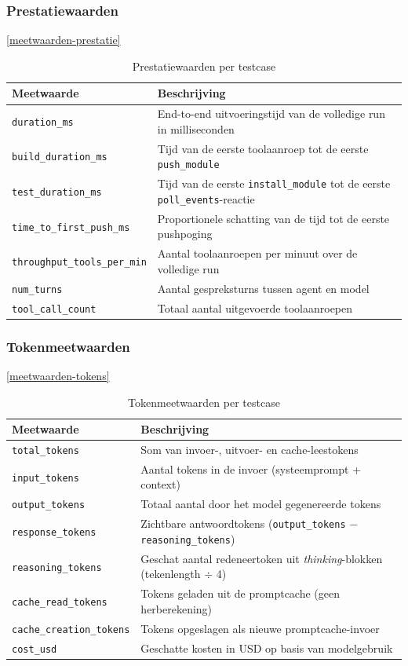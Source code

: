\subsubsection{Prestatiewaarden}
\ref{meetwaarden-prestatie}
\begin{table}[h]
\centering
\begin{tabular}{lp{9cm}}
\hline
\textbf{Meetwaarde} & \textbf{Beschrijving} \\
\hline
\texttt{duration\_ms} & End-to-end uitvoeringstijd van de volledige run in milliseconden \\
\texttt{build\_duration\_ms} & Tijd van de eerste toolaanroep tot de eerste \texttt{push\_module} \\
\texttt{test\_duration\_ms} & Tijd van de eerste \texttt{install\_module} tot de eerste \texttt{poll\_events}-reactie \\
\texttt{time\_to\_first\_push\_ms} & Proportionele schatting van de tijd tot de eerste pushpoging \\
\texttt{throughput\_tools\_per\_min} & Aantal toolaanroepen per minuut over de volledige run \\
\texttt{num\_turns} & Aantal gespreksturns tussen agent en model \\
\texttt{tool\_call\_count} & Totaal aantal uitgevoerde toolaanroepen \\
\hline
\end{tabular}
\caption{Prestatiewaarden per testcase}\label{tab:meetwaarden-prestatie}
\end{table}

\subsubsection{Tokenmeetwaarden}
\ref{meetwaarden-tokens}
\begin{table}[h]
\centering
\begin{tabular}{lp{9cm}}
\hline
\textbf{Meetwaarde} & \textbf{Beschrijving} \\
\hline
\texttt{total\_tokens} & Som van invoer-, uitvoer- en cache-leestokens \\
\texttt{input\_tokens} & Aantal tokens in de invoer (systeemprompt + context) \\
\texttt{output\_tokens} & Totaal aantal door het model gegenereerde tokens \\
\texttt{response\_tokens} & Zichtbare antwoordtokens (\texttt{output\_tokens} $-$ \texttt{reasoning\_tokens}) \\
\texttt{reasoning\_tokens} & Geschat aantal redeneertoken uit \textit{thinking}-blokken (tekenlength $\div$ 4) \\
\texttt{cache\_read\_tokens} & Tokens geladen uit de promptcache (geen herberekening) \\
\texttt{cache\_creation\_tokens} & Tokens opgeslagen als nieuwe promptcache-invoer \\
\texttt{cost\_usd} & Geschatte kosten in USD op basis van modelgebruik \\
\hline
\end{tabular}
\caption{Tokenmeetwaarden per testcase}\label{tab:meetwaarden-tokens}

\end{table}

